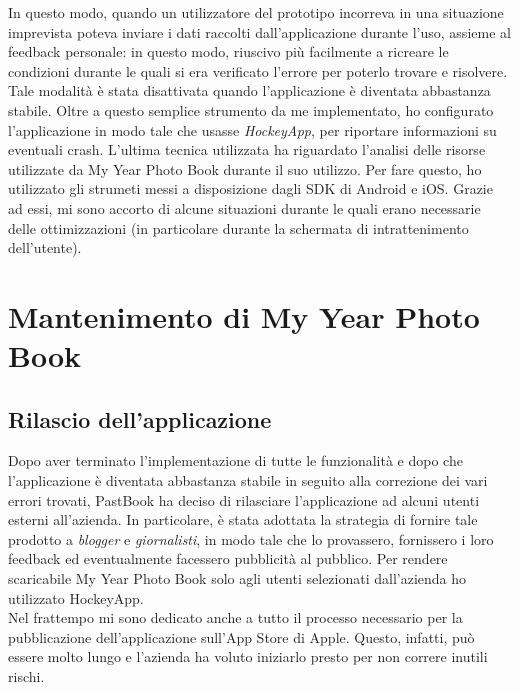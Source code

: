 			In questo modo, quando un utilizzatore del prototipo incorreva in una situazione imprevista poteva inviare i dati raccolti
			dall'applicazione durante l'uso, assieme al feedback personale: in questo modo, riuscivo più facilmente a ricreare le
			condizioni durante le quali si era verificato l'errore per poterlo trovare e risolvere.	Tale modalità è stata disattivata
			quando l'applicazione è diventata abbastanza stabile. Oltre a questo semplice strumento da me implementato, ho configurato
			l'applicazione in modo tale che usasse \emph{HockeyApp}, per riportare informazioni su eventuali crash.
			L'ultima tecnica utilizzata ha riguardato l'analisi delle risorse utilizzate da My Year Photo Book durante il suo utilizzo.
			Per fare questo, ho utilizzato gli strumeti messi a disposizione dagli SDK di Android e iOS. Grazie ad essi, mi sono accorto di
			alcune situazioni durante le quali erano necessarie delle ottimizzazioni (in particolare durante la schermata di
			intrattenimento dell'utente).
	\section{Mantenimento di My Year Photo Book}
		\subsection{Rilascio dell'applicazione}
			Dopo aver terminato l'implementazione di tutte le funzionalità e dopo che l'applicazione è diventata abbastanza stabile in
			seguito alla correzione dei vari errori trovati, PastBook ha deciso di rilasciare l'applicazione ad alcuni utenti esterni
			all'azienda. In particolare, è stata adottata la strategia di fornire tale prodotto a \emph{blogger} e \emph{giornalisti}, in
			modo tale che lo provassero, fornissero i loro feedback ed eventualmente facessero pubblicità al pubblico. Per rendere
			scaricabile My Year Photo Book solo agli utenti selezionati dall'azienda ho utilizzato HockeyApp.\\
			Nel frattempo mi sono dedicato anche a tutto il processo necessario per la pubblicazione dell'applicazione sull'App Store di
			Apple. Questo, infatti, può essere molto lungo e l'azienda ha voluto iniziarlo presto per non correre inutili rischi.
